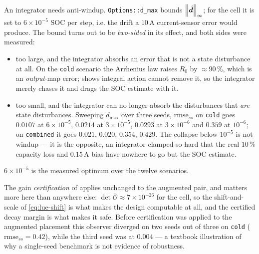 An integrator needs anti-windup.  \texttt{Options::d\_max} bounds $\left\lVert \hat{\bm{d}} \right\rVert_\infty$;
for the cell it is set to $6\times10^{-5}$ SOC per step, i.e. the drift a $10$\,A current-sensor
error would produce.  The bound turns out to be \emph{two-sided} in its effect, and both sides
were measured:
\begin{itemize}[nosep]
\item too large, and the integrator absorbs an error that is not a state disturbance at all.  On
the \texttt{cold} scenario the Arrhenius law raises $R_0$ by $\approx 90\,\%$, which is an
\emph{output}-map error;  shows integral action cannot remove it, so the
integrator merely chases it and drags the SOC estimate with it.
\item too small, and the integrator can no longer absorb the disturbances that \emph{are} state
disturbances.  Sweeping $d_{\max}$ over three seeds, $\mathrm{rmse}_{ss}$ on \texttt{cold} goes
$0.0107$ at $6\times10^{-5}$, $0.0214$ at $3\times10^{-5}$, $0.0293$ at $3\times10^{-6}$ and
$0.359$ at $10^{-6}$; on \texttt{combined} it goes $0.021$, $0.020$, $0.354$, $0.429$.  The
collapse below $10^{-5}$ is not windup --- it is the opposite, an integrator clamped so hard that
the real $10\,\%$ capacity loss and $0.15$\,A bias have nowhere to go but the SOC estimate.
\end{itemize}
$6\times10^{-5}$ is the measured optimum over the twelve scenarios.

The gain \emph{certification} of  applies unchanged to the augmented
pair, and matters more here than anywhere else: $\det\bar{\mathcal{O}}\approx 7\times10^{-26}$
for the cell, so the shift-and-scale of \eqref{eq:lue-shift} is what makes the design computable
at all, and the certified decay margin is what makes it safe.  Before certification was applied
to the augmented placement this observer diverged on two seeds out of three on \texttt{cold}
($\mathrm{rmse}_{ss}=0.42$), while the third seed was at $0.004$ --- a textbook illustration of
why a single-seed benchmark is not evidence of robustness.

